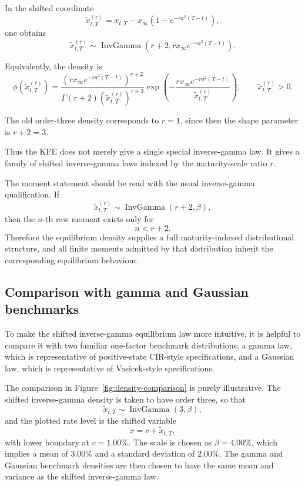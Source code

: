 \documentclass[11pt]{article}
\theoremstyle{plainbreak}
\begin{document}
In the shifted coordinate
\[
\widetilde{x}^{(r)}_{t,T}
=
x_{t,T}
-
x_\infty\left(1-e^{-ra^2(T-t)}\right),
\]
one obtains
\[
\widetilde{x}^{(r)}_{t,T}
\sim
\operatorname{InvGamma}
\left(
r+2,
rx_\infty e^{-ra^2(T-t)}
\right).
\]

Equivalently, the density is
\[
\phi(\widetilde{x}^{(r)}_{t,T})
=
\frac{
\left(rx_\infty e^{-ra^2(T-t)}\right)^{r+2}
}{
\Gamma(r+2)
\left(\widetilde{x}^{(r)}_{t,T}\right)^{r+3}
}
\exp\left(
-
\frac{rx_\infty e^{-ra^2(T-t)}}{\widetilde{x}^{(r)}_{t,T}}
\right),
\qquad \widetilde{x}^{(r)}_{t,T}>0.
\]

The old order-three density corresponds to \(r=1\), since then the shape parameter is \(r+2=3\).

Thus the KFE does not merely give a single special inverse-gamma law. It gives a family of shifted inverse-gamma laws indexed by the maturity-scale ratio \(r\).

The moment statement should be read with the usual inverse-gamma qualification. If
\[
\widetilde{x}^{(r)}_{t,T}\sim \operatorname{InvGamma}(r+2,\beta),
\]
then the \(n\)-th raw moment exists only for
\[
n<r+2.
\]
Therefore the equilibrium density supplies a full maturity-indexed distributional structure, and all finite moments admitted by that distribution inherit the corresponding equilibrium behaviour.

\subsection{Comparison with gamma and Gaussian benchmarks}

To make the shifted inverse-gamma equilibrium law more intuitive, it is helpful to compare it with two familiar one-factor benchmark distributions: a gamma law, which is representative of positive-state CIR-style specifications, and a Gaussian law, which is representative of Vasicek-style specifications.

The comparison in Figure~\ref{fig:density-comparison} is purely illustrative. The shifted inverse-gamma density is taken to have order three, so that
\[
\widetilde{x}_{t,T}\sim \operatorname{InvGamma}(3,\beta),
\]
and the plotted rate level is the shifted variable
\[
x = c + \widetilde{x}_{t,T},
\]
with lower boundary at \(c=1.00\%\). The scale is chosen as \(\beta=4.00\%\), which implies a mean of \(3.00\%\) and a standard deviation of \(2.00\%\). The gamma and Gaussian benchmark densities are then chosen to have the same mean and variance as the shifted inverse-gamma law.
\end{document}
